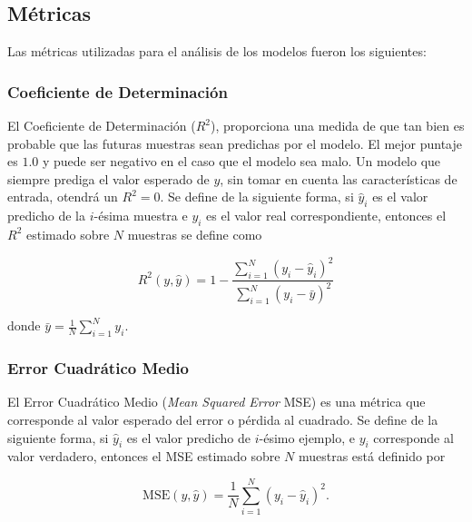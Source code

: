 \documentclass[spanish]{article}
\begin{document}
        
      \subsection{Métricas}
      
        Las métricas utilizadas para el análisis de los modelos fueron los siguientes:
        
        \subsubsection{Coeficiente de Determinación}
        
          El Coeficiente de Determinación ($R^2$), proporciona una medida de que tan bien es probable 
          que las futuras muestras sean predichas por el modelo. El mejor puntaje es $1.0$ y puede ser 
          negativo en el caso que el modelo sea malo. Un modelo que siempre prediga el valor esperado 
          de $y$, sin tomar en cuenta las características de entrada, otendrá un $R^2=0$. Se define de 
          la siguiente forma, si $\hat{y}_i$ es el valor predicho de la $i$-ésima muestra e $y_i$ es el 
          valor real correspondiente, entonces el $R^2$ estimado sobre $N$ muestras se define como
          
          \begin{equation}
            R^2(y, \hat{y}) = 1 - \frac{\sum_{i=1}^{N} (y_i - \hat{y}_i)^2}{\sum_{i=1}^{N} (y_i - \bar{y})^2}
          \end{equation}

          donde $\bar{y} =  \frac{1}{N} \sum_{i=1}^{N} y_i$.
          
          
        \subsubsection{Error Cuadrático Medio}
        
          El Error Cuadrático Medio (\emph{Mean Squared Error} MSE) es una métrica que corresponde al 
          valor esperado del error o pérdida al cuadrado. Se define de la siguiente forma, si $\hat{y}_i$ 
          es el valor predicho de $i$-ésimo ejemplo, e $y_i$ corresponde al valor verdadero, entonces
          el MSE estimado sobre $N$ muestras está definido por
          
          \begin{equation}
            \text{MSE}(y, \hat{y}) = \frac{1}{N} \sum_{i=1}^{N} (y_i - \hat{y}_i)^2.
          \end{equation}
\end{document}
